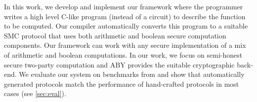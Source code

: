 
In this work, we develop and implement our framework \tool where the programmer writes a high level C-like program (instead of a circuit) to describe the function to be computed. Our compiler automatically converts this program to a suitable SMC protocol that uses both arithmetic and boolean secure computation components. Our framework can work with any secure implementation of a mix of arithmetic and boolean computations. In our work, we focus on semi-honest secure two-party computation and  ABY \cite{aby} provides the suitable cryptographic back-end.  We evaluate our system on benchmarks from \cite{} and show that automatically generated protocols match the performance of hand-crafted protocols in most cases (see \ref{sec:eval}). 


